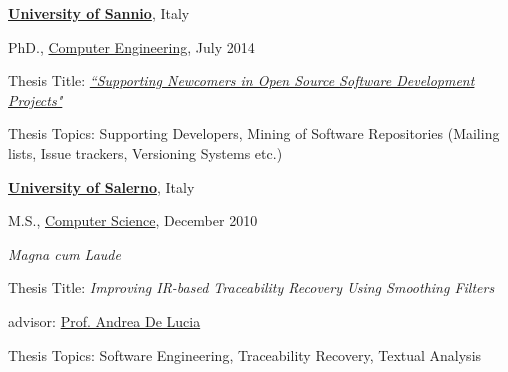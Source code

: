 \documentclass[10pt]{article}
\begin{document}
\href{http://www.ing.unisannio.it/}{\textbf{University of Sannio}}, Italy
\begin{outerlist}
\item[] PhD.,
        \href{http://www.ing.unisannio.it/}
             {Computer Engineering}, July 2014
        \begin{innerlist}
        \item Thesis Title: \emph{\href{http://www.ifi.uzh.ch/seal/people/panichella/Dissertation_Sebastiano_Panichella.pdf}{\textit{``Supporting Newcomers in Open Source Software Development Projects"}}}
        \item Thesis Topics: Supporting Developers, Mining of Software Repositories (Mailing lists, Issue trackers, Versioning Systems etc.)\\
 \end{innerlist}
\end{outerlist}

\href{http://www.unisa.it/}{\textbf{University of Salerno}}, Italy
\begin{outerlist}
\item[] M.S.,
        \href{http://www.unisa.it/facolta/scienze_mmffnn/index}
             {Computer Science}, December 2010
        \begin{innerlist}
        \item \emph{Magna cum Laude}
        \item Thesis Title: \emph{Improving IR-based Traceability Recovery Using Smoothing Filters}
        \item advisor:
              \href{http://www.dmi.unisa.it/people/delucia/www/}
                   {Prof. Andrea De Lucia}
        \item Thesis Topics: Software Engineering, Traceability Recovery, Textual Analysis\\
 \end{innerlist}
\end{outerlist}
\end{document}
